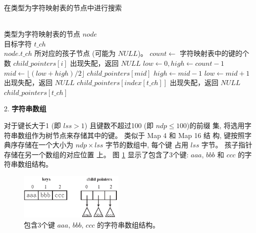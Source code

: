 \begin{algorithm}
  \caption{在类型为字符映射表的节点中进行搜索}
  \label{alg:character map}
  \begin{algorithmic}[1]
    \REQUIRE ~~\\
    类型为字符映射表的节点 $node$\\
    目标字符 $t\_ch$
    \ENSURE ~~\\
     $node.t\_ch$ 所对应的孩子节点 (可能为 $NULL$)。
    \STATE
    \STATE $count \leftarrow$ 字符映射表中的键的个数
    \STATE
    \RETURN $child\_pointers[i]$
    \ENDIF
    \ENDFOR
    \STATE 出现失配，返回 $NULL$
    \ENDCASE
    \STATE
    \STATE $low \leftarrow 0, high \leftarrow count-1$
    \STATE $mid \leftarrow \lfloor (low+high)/2 \rfloor$
    \RETURN $child\_pointers[mid]$
    \STATE $high \leftarrow mid-1$
    \ELSE
    \STATE $low \leftarrow mid+1$
    \ENDIF
    \ENDWHILE
    \STATE 出现失配，返回 $NULL$
    \ENDCASE
    \STATE
    \RETURN $child\_pointers[index[t\_ch]]$
    \ELSE
    \STATE 出现失配，返回 $NULL$
    \ENDIF
    \ENDCASE
    \STATE
    \RETURN $child\_pointers[t\_ch]$
    \ENDCASE
    \ENDPWITCH
  \end{algorithmic}
\end{algorithm}

2. \textbf{字符串数组}


对于键长大于1 (即 $lss > 1$) 且键数不超过100 (即 $ndp \leq 100$)的前缀
集, 将选用字符串数组作为树节点来存储其中的键。 类似于 Map 4 和 Map 16 结
构, 键按照字典序存储在一个大小为 $ndp \times lss$ 字节的数组中, 每个键
占用 $lss$ 字节。 孩子指针存储在另一个数组的对应位置
上。 图 \ref{fig:string array} 显示了包含了3个键: $aaa$, $bbb$ 和 $ccc$
的字符串数组结构。

\begin{figure}[H]
  \centering
  \includegraphics[width=0.45\textwidth]{figures/2_MPM/string_array}
  \caption{包含3个键 $aaa,\, bbb,\, ccc$ 的字符串数组结构。}
  \label{fig:string array}
\end{figure}

